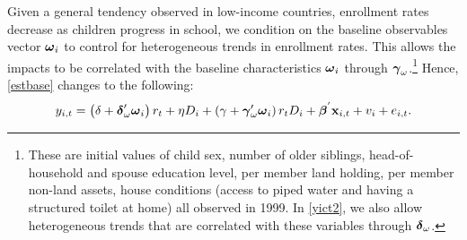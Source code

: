\documentclass[12pt,letterpaper]{article}
\newcommand{\bfbeta}{\ensuremath{\mbox{\boldmath $\beta$}}}
\newcommand{\bfgamma}{\ensuremath{\mbox{\boldmath $\gamma$}}}
\newcommand{\bfdelta}{\ensuremath{\mbox{\boldmath $\delta$}}}
\newcommand{\bfomega}{\ensuremath{\mbox{\boldmath $\omega$}}}
\newcommand{\0}{\ensuremath{\mbox{\boldmath $0$}}}
\begin{document}
Given a general tendency observed in low-income countries, enrollment rates decrease as children progress in school, we condition on the baseline observables vector $\bfomega_{i}$ to control for heterogeneous trends in enrollment rates. This allows the impacts to be correlated with the baseline characteristics $\bfomega_{i}$ through $\bfgamma_{\omega}$.\footnote{These are initial values of child sex, number of older siblings, head-of-household and spouse education level, per member land holding, per member non-land assets, house conditions (access to piped water and having a structured toilet at home) all observed in 1999. In \eqref{yict2}, we also allow heterogeneous trends that are correlated with these variables through $\bfdelta_{\omega}$. }
Hence, \eqref{estbase} changes to the following:
\begin{equation}
y_{i,t} = 
\left(\delta +\bfdelta'_{\omega}\bfomega_{i}\right)r_{t} + \eta D_{i} +
\left(\gamma + \bfgamma'_{\omega}\bfomega_{i}\right)r_{t}D_{i} + 
\bfbeta^{'}\textbf{x}_{i,t} + v_{i} + e_{i,t}.
\label{yict2}
\end{equation}



\end{document}
